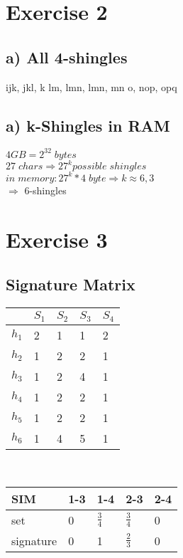 \documentclass{article}
\begin{document}
\vspace{1cm}
\section*{Exercise 2}
\subsection*{a) All 4-shingles}
ijk\textvisiblespace, jk\textvisiblespace l, k\textvisiblespace
lm, \textvisiblespace lmn, lmn\textvisiblespace, mn\textvisiblespace
o, n\textvisiblespace op, \textvisiblespace opq

\vspace{1cm}
\subsection*{a) k-Shingles in RAM}
$4 GB = 2^{32} \;bytes$\\
$27 \; chars \Rightarrow 27^{k} possible \; shingles$\\
$in \; memory: 27^{k} * 4 \; byte \Rightarrow k \approx 6,3$\\


$\Rightarrow$ 6-shingles 

\vspace{1cm}
\section*{Exercise 3}
\subsection*{Signature Matrix}

\begin{tabular}{ l | l l l l }
   & $S_1$ & $S_2$ & $S_3$ & $S_4$ \\                 
  \hline      
$h_1$   & 2 & 1 & 1 & 2 \\                 
$h_2$   & 1 & 2 & 2 & 1 \\                 
$h_3$   & 1 & 2 & 4 & 1 \\                 
$h_4$   & 1 & 2 & 2 & 1 \\                 
$h_5$   & 1 & 2 & 2 & 1 \\                 
$h_6$   & 1 & 4 & 5 & 1 \\                 
\end{tabular}
\vspace{0.5cm}\\
\begin{tabular}{ l | l l l l }
SIM & 1-3 & 1-4 & 2-3 & 2-4 \\
  \hline                       
set & 0 & $\frac{3}{4}$ & $\frac{3}{4}$ & 0\\
signature & 0 & 1 & $\frac{2}{3}$ & 0\\
\end{tabular}
\vspace{1cm}
\end{document}
